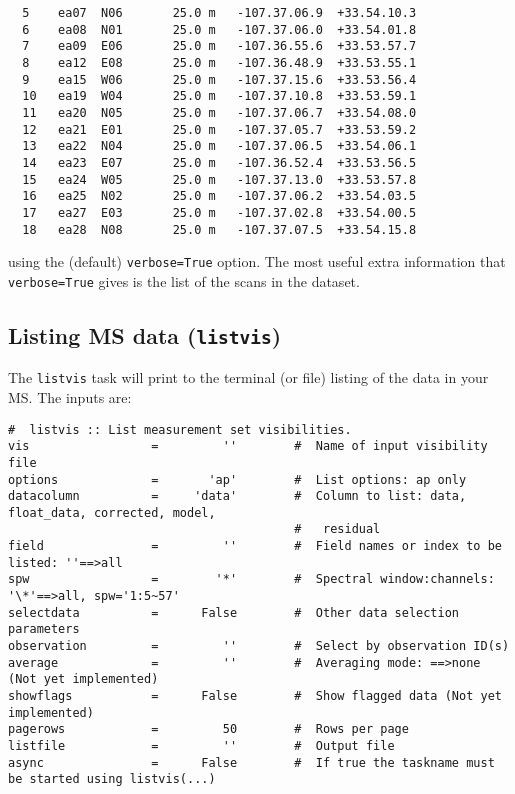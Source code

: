 \begin{verbatim}
  5    ea07  N06       25.0 m   -107.37.06.9  +33.54.10.3  
  6    ea08  N01       25.0 m   -107.37.06.0  +33.54.01.8  
  7    ea09  E06       25.0 m   -107.36.55.6  +33.53.57.7  
  8    ea12  E08       25.0 m   -107.36.48.9  +33.53.55.1  
  9    ea15  W06       25.0 m   -107.37.15.6  +33.53.56.4  
  10   ea19  W04       25.0 m   -107.37.10.8  +33.53.59.1  
  11   ea20  N05       25.0 m   -107.37.06.7  +33.54.08.0  
  12   ea21  E01       25.0 m   -107.37.05.7  +33.53.59.2  
  13   ea22  N04       25.0 m   -107.37.06.5  +33.54.06.1  
  14   ea23  E07       25.0 m   -107.36.52.4  +33.53.56.5  
  15   ea24  W05       25.0 m   -107.37.13.0  +33.53.57.8  
  16   ea25  N02       25.0 m   -107.37.06.2  +33.54.03.5  
  17   ea27  E03       25.0 m   -107.37.02.8  +33.54.00.5  
  18   ea28  N08       25.0 m   -107.37.07.5  +33.54.15.8  

\end{verbatim}
\normalsize
using the (default) {\tt verbose=True} option.
The most useful extra information that {\tt verbose=True} gives
is the list of the scans in the dataset.

\subsection{Listing MS data ({\tt listvis})}
\label{section:io.vis.listvis}

The {\tt listvis} task will print to the terminal (or file) listing
of the data in your MS.
The inputs are:
\small
\begin{verbatim}
#  listvis :: List measurement set visibilities.
vis                 =         ''        #  Name of input visibility file
options             =       'ap'        #  List options: ap only
datacolumn          =     'data'        #  Column to list: data, float_data, corrected, model,
                                        #   residual
field               =         ''        #  Field names or index to be listed: ''==>all
spw                 =        '*'        #  Spectral window:channels: '\*'==>all, spw='1:5~57'
selectdata          =      False        #  Other data selection parameters
observation         =         ''        #  Select by observation ID(s)
average             =         ''        #  Averaging mode: ==>none (Not yet implemented)
showflags           =      False        #  Show flagged data (Not yet implemented)
pagerows            =         50        #  Rows per page
listfile            =         ''        #  Output file
async               =      False        #  If true the taskname must be started using listvis(...)
\end{verbatim}
\normalsize

